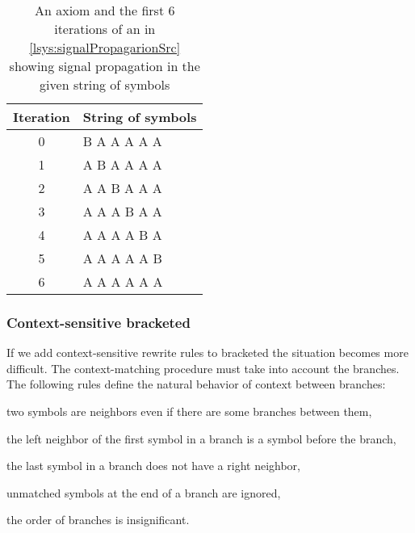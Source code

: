 \begin{table}[h]
	\centering
	\begin{tabular}{c l}
   		\toprule
   		Iteration & String of symbols \\
   		\midrule
		0 & B A A A A A \\
		1 & A B A A A A \\
		2 & A A B A A A \\
		3 & A A A B A A \\
		4 & A A A A B A \\
		5 & A A A A A B \\
		6 & A A A A A A \\
		\bottomrule
	\end{tabular}
	\caption{An axiom and the first 6 iterations of an \lsystem in \autoref{lsys:signalPropagarionSrc} showing signal propagation in the given string of symbols}
	\label{fig:signalPropagarion}
\end{table}


\subsubsection{Context-sensitive bracketed \lsystems}
\label{sec:bracketedLsystems}

If we add context-sensitive rewrite rules to bracketed \lsystems the situation becomes more difficult.
The context-matching procedure must take into account the branches.
The following rules define the natural behavior of context between branches:
\begin{enumerate*}
	\item \label{enum:ctxRule1} two symbols are neighbors even if there are some branches between them,
	\item \label{enum:ctxRule2} the left neighbor of the first symbol in a branch is a symbol before the branch,
	\item \label{enum:ctxRule3} the last symbol in a branch does not have a right neighbor,
	\item \label{enum:ctxRule4} unmatched symbols at the end of a branch are ignored,
	\item \label{enum:ctxRule5} the order of branches is insignificant.
\end{enumerate*}

